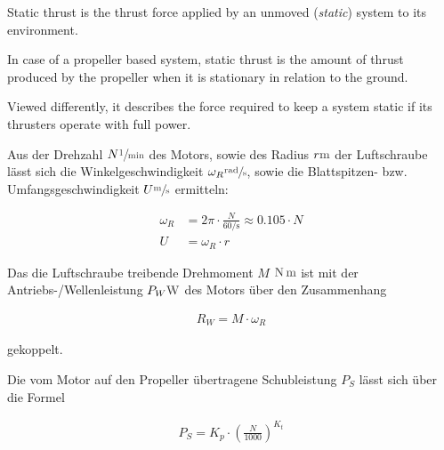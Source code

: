 
Static thrust %
is the thrust force applied by an unmoved (\textit{static}) system to its environment.

In case of a propeller based system, static thrust is the amount of thrust 
produced by the propeller when it is stationary in relation to the ground.

Viewed differently, it describes the force required to keep a system static if its 
thrusters operate with full power. 



\bigbreak

Aus der Drehzahl 
$N \withunit{\per\minute}$ 
des Motors, sowie des Radius 
$r \withunit{\metre}$ 
der Luftschraube lässt sich die Winkelgeschwindigkeit 
$\omega_R \withunit{\radian\per\second}$, 
sowie die Blattspitzen- bzw. Umfangsgeschwindigkeit 
$U \withunit{\metre\per\second}$ 
ermitteln:

\begin{align}
	\omega_R &= 2\pi \cdot \frac{N}{60 \si{\per\second}} \approx 0.105 \cdot N \\
	U &= \omega_R \cdot r
\end{align}

\bigbreak

Das die Luftschraube treibende Drehmoment $M$ $\withunit{\newton\meter}$ ist mit der Antriebs-/Wellenleistung $P_W \withunit{\watt}$ des Motors über den Zusammenhang

\begin{align}
	R_W = M \cdot \omega_R
\end{align}

gekoppelt.

\bigbreak {}

Die vom Motor auf den Propeller übertragene Schubleistung $P_S$ lässt sich über die Formel

\begin{align}
	P_S = K_p \cdot \left(\frac{N}{1000}\right)^{K_t}
\end{align}

